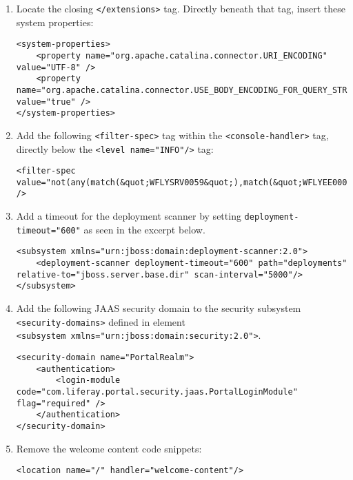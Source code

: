 \begin{enumerate}
\def\labelenumi{\arabic{enumi}.}
\item
  Locate the closing \texttt{\textless{}/extensions\textgreater{}} tag.
  Directly beneath that tag, insert these system properties:

\begin{verbatim}
<system-properties>
    <property name="org.apache.catalina.connector.URI_ENCODING" value="UTF-8" />
    <property name="org.apache.catalina.connector.USE_BODY_ENCODING_FOR_QUERY_STRING" value="true" />
</system-properties>
\end{verbatim}
\item
  Add the following \texttt{\textless{}filter-spec\textgreater{}} tag
  within the \texttt{\textless{}console-handler\textgreater{}} tag,
  directly below the
  \texttt{\textless{}level\ name="INFO"/\textgreater{}} tag:

\begin{verbatim}
<filter-spec value="not(any(match(&quot;WFLYSRV0059&quot;),match(&quot;WFLYEE0007&quot;)))" />
\end{verbatim}
\item
  Add a timeout for the deployment scanner by setting
  \texttt{deployment-timeout="600"} as seen in the excerpt below.

\begin{verbatim}
<subsystem xmlns="urn:jboss:domain:deployment-scanner:2.0">
    <deployment-scanner deployment-timeout="600" path="deployments" relative-to="jboss.server.base.dir" scan-interval="5000"/>
</subsystem>
\end{verbatim}
\item
  Add the following JAAS security domain to the security subsystem
  \texttt{\textless{}security-domains\textgreater{}} defined in element
  \texttt{\textless{}subsystem\ xmlns="urn:jboss:domain:security:2.0"\textgreater{}}.

\begin{verbatim}
<security-domain name="PortalRealm">
    <authentication>
        <login-module code="com.liferay.portal.security.jaas.PortalLoginModule" flag="required" />
    </authentication>
</security-domain>
\end{verbatim}
\item
  Remove the welcome content code snippets:

\begin{verbatim}
<location name="/" handler="welcome-content"/>
\end{verbatim}


\end{enumerate}
